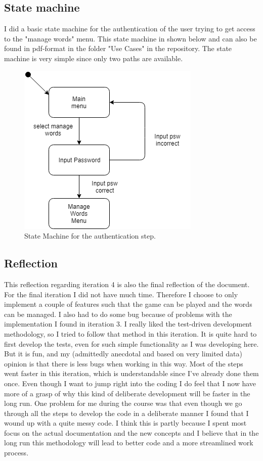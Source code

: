 \documentclass[12pt, letterpaper]{article}
\begin{document}
\subsection{State machine}
I did a basic state machine for the authentication of the user trying to get access to the "manage words" menu. This state machine in shown below and can also be found in pdf-format in the folder "Use Cases" in the repository. The state machine is very simple since only two paths are available.
\begin{figure}[H]\label{fig6}
	\centering
	\includegraphics[scale=0.5]{statemachineauth.png}
	\caption{State Machine for the authentication step.}
\end{figure}
\subsection{Reflection}
This reflection regarding iteration 4 is also the final reflection of the document. For the final iteration I did not have much time. Therefore I choose to only implement a couple of features such that the game can be played and the words can be managed. I also had to do some bug because of problems with the implementation I found in iteration 3. I really liked the test-driven development methodology, so I tried to follow that method in this iteration. It is quite hard to first develop the tests, even for such simple functionality as I was developing here. But it is fun, and my (admittedly anecdotal and based on very limited data) opinion is that there is less bugs when working in this way. Most of the steps went faster in this iteration, which is understandable since I've already done them once. Even though I want to jump right into the coding I do feel that I now have more of a grasp of why this kind of deliberate development will be faster in the long run. One problem for me during the course was that even though we go through all the steps to develop the code in a deliberate manner I found that I wound up with a quite messy code. I think this is partly because I spent most focus on the actual documentation and the new concepts and I believe that in the long run this methodology will lead to better code and a more streamlined work process.
\end{document}
